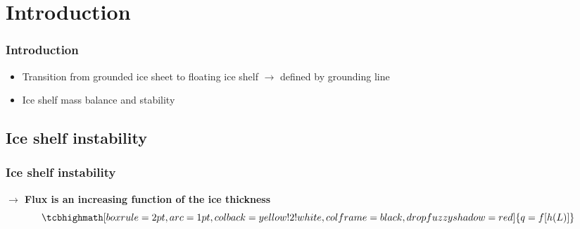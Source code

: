 \documentclass[t, pdftex]{beamer}
\begin{document}
\section{Introduction}
\begin{frame}
	\frametitle{Introduction}
	\begin{itemize}
		\item   Transition from grounded ice sheet to floating ice shelf $\rightarrow$ defined by grounding line
		\item   Ice shelf mass balance and stability 
	\end{itemize}
    \vspace{0.2cm}
      \begin{figure}
    \end{figure}
    \vspace{-.3cm}
\end{frame}
   
\subsection{Ice shelf instability}
\begin{frame}
	\frametitle{Ice shelf instability}
    \textcolor{utorange}{\textbf{$\rightarrow$ Flux is an increasing function of the ice thickness}}
    	\begin{equation}
	\nonumber
	\tcbhighmath[boxrule=2pt,arc=1pt,colback=yellow!2!white,colframe=black,
		drop fuzzy shadow=red]{q= f[h(L)]}
	\end{equation}
    \vspace{-.3cm}
        \begin{figure}
    \end{figure}
    
\end{frame}
   
   
   
   
\end{document}
